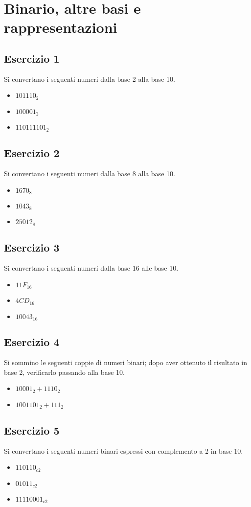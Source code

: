 \documentclass{article}
\begin{document}
\section*{Binario, altre basi e rappresentazioni}
\subsection*{Esercizio 1}
Si convertano i seguenti numeri dalla base 2 alla base 10.
\begin{itemize}
\item ${101110}_2$
\item ${100001}_2$
\item ${110111101}_2$
\end{itemize}

\subsection*{Esercizio 2}
Si convertano i seguenti numeri dalla base 8 alla base 10.
\begin{itemize}
\item ${1670}_8$
\item ${1043}_8$
\item ${25012}_8$
\end{itemize}

\subsection*{Esercizio 3}
Si convertano i seguenti numeri dalla base 16 alle base 10.
\begin{itemize}
\item ${11F}_{16}$
\item ${4CD}_{16}$
\item ${10043}_{16}$
\end{itemize}

\subsection*{Esercizio 4}
Si sommino le seguenti coppie di numeri binari; dopo aver ottenuto il risultato in base 2, verificarlo passando alla base 10.
\begin{itemize}
\item ${10001}_2 + {1110}_2$
\item ${1001101}_2 + {111}_2$
\end{itemize}

\subsection*{Esercizio 5}
Si convertano i seguenti numeri binari espressi con complemento a 2 in base 10.
\begin{itemize}
\item ${110110}_{c2}$
\item ${01011}_{c2}$
\item ${11110001}_{c2}$
\end{itemize}
\end{document}
